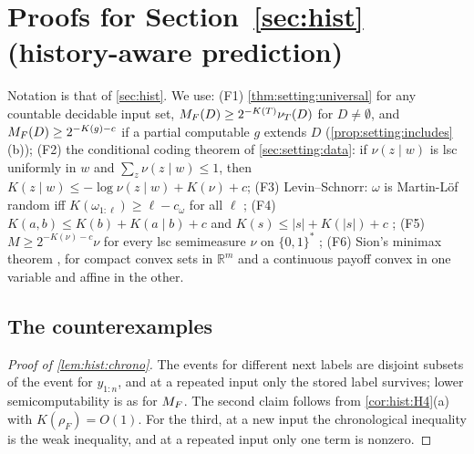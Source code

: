 \section{Proofs for Section~\ref{sec:hist} (history-aware prediction)}\label{app:hist}

Notation is that of \cref{sec:hist}. We use: (F1) \cref{thm:setting:universal} for any countable decidable input set, $M_{F}(D)\ge2^{-K(T)}\nu_T(D)$ for $D\ne\emptyset$, and $M_{F}(D)\ge2^{-K(g)-c}$ if a partial computable $g$ extends $D$ (\cref{prop:setting:includes}(b)); (F2) the conditional coding theorem of \cref{sec:setting:data}: if $\nu(z\mid w)$ is lsc uniformly in $w$ and $\sum_z\nu(z\mid w)\le1$, then $K(z\mid w)\le-\log\nu(z\mid w)+K(\nu)+c$; (F3) Levin--Schnorr: $\omega$ is Martin-L\"of random iff $K(\omega_{1:\ell})\ge\ell-c_\omega$ for all $\ell$ \citep{li2008introduction}; (F4) $K(a,b)\le K(b)+K(a\mid b)+c$ and $K(s)\le|s|+K(|s|)+c$ \citep{li2008introduction}; (F5) $M\ge2^{-K(\nu)-c}\nu$ for every lsc semimeasure $\nu$ on $\{0,1\}^*$ \citep{zvonkin1970complexity,li2008introduction}; (F6) Sion's minimax theorem \citep{sion1958general}, for compact convex sets in $\mathbb R^m$ and a continuous payoff convex in one variable and affine in the other.

\subsection{The counterexamples}\label{app:hist:counter}

\begin{proof}[Proof of \cref{lem:hist:chrono}]
The events for different next labels are disjoint subsets of the event for $y_{1:n}$, and at a repeated input only the stored label survives; lower semicomputability is as for $M_{F}$. The second claim follows from \cref{cor:hist:H4}(a) with $K(\rho_F)=O(1)$. For the third, at a new input the chronological inequality is the weak inequality, and at a repeated input only one term is nonzero.
\end{proof}

